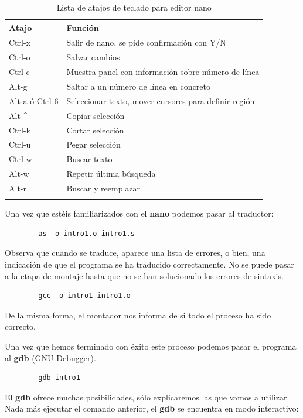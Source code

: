 \begin{longtable}{| p{1.3cm} | p{12cm} |}
\hline
{\bf Atajo} & {\bf Función} \\ \hline
Ctrl-x & Salir de nano, se pide confirmación con Y/N \\ \hline
Ctrl-o & Salvar cambios \\ \hline
Ctrl-c & Muestra panel con información sobre número de línea \\ \hline
Alt-g  & Saltar a un número de línea en concreto \\ \hline
Alt-a ó\newline
Ctrl-6 & Seleccionar texto, mover cursores para definir región  \\ \hline
Alt-\^ & Copiar selección \\ \hline
Ctrl-k & Cortar selección \\ \hline
Ctrl-u & Pegar selección \\ \hline
Ctrl-w & Buscar texto \\ \hline
Alt-w  & Repetir última búsqueda \\ \hline
Alt-r  & Buscar y reemplazar \\ \hline
\caption{Lista de atajos de teclado para editor nano}
\label{list_nano}
\end{longtable}

Una vez que estéis familiarizados con el {\bf nano} podemos pasar al
traductor:

\begin{lstlisting}
        as -o intro1.o intro1.s
\end{lstlisting}

Observa que cuando se traduce, aparece una lista de errores, o bien, una
indicación de que el programa se ha traducido correctamente.
No se puede pasar a la etapa de montaje hasta que no se han solucionado
los errores de sintaxis.

\begin{lstlisting}
        gcc -o intro1 intro1.o
\end{lstlisting}

De la misma forma, el montador nos informa de si todo el proceso ha sido
correcto.

Una vez que hemos terminado con éxito este proceso podemos pasar el programa al
{\bf gdb} (GNU Debugger).

\begin{lstlisting}
        gdb intro1
\end{lstlisting}

El {\bf gdb} ofrece muchas posibilidades, sólo explicaremos las que vamos
a utilizar. Nada más ejecutar el comando anterior, el {\bf gdb} se encuentra
en modo interactivo:

